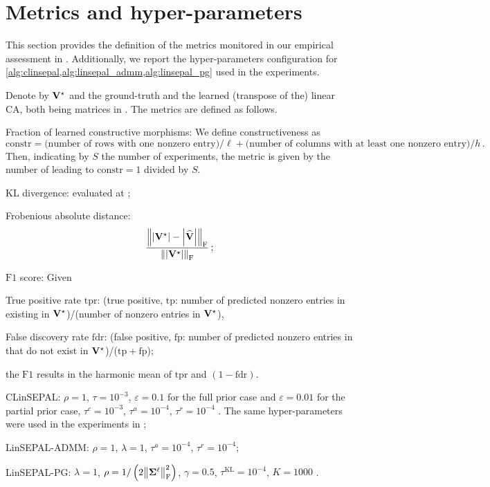 \section{Metrics and hyper-parameters}\label{app:metrics}

This section provides the definition of the metrics monitored in our empirical assessment in .
Additionally, we report the hyper-parameters configuration for \cref{alg:clinsepal,alg:linsepal_admm,alg:linsepal_pg} used in the experiments.

Denote by $\mathbf{V}^\star$ and \Vhat the ground-truth and the learned (transpose of the) linear CA, both being matrices in \rmatdim.
The metrics are defined as follows.
\begin{squishlist}
    \item Fraction of learned constructive morphisms: We define constructiveness as 
    \begin{equation}
        \mathrm{constr}=\text{(number of rows with one nonzero entry)}/\ell +\text{(number of columns with at least one nonzero entry)}/h\,.
    \end{equation}
    Then, indicating by $S$ the number of experiments, the metric is given by the number of \Vhat leading to $\mathrm{constr}=1$ divided by $S$.
    \item KL divergence:  evaluated at \Vhat;
    \item Frobenious absolute distance: 
    \begin{equation}
        \frac{\norm{\abs{\mathbf{V}^\star} - \abs{\widehat{\mathbf{V}}}}_{\mathrm{F}}}{\norm{\abs{\mathbf{V}^\star}}_{\mathrm{F}}}\,;
    \end{equation}
    \item $\mathrm{F1}$ score: Given
    \begin{squishlist}
        \item True positive rate $\mathrm{tpr}$: (true positive, $\mathrm{tp}$: number of predicted nonzero entries in \Vhat existing in $\mathbf{V}^\star$)/(number of nonzero entries in $\mathbf{V}^\star$),
        \item False discovery rate $\mathrm{fdr}$: (false positive, $\mathrm{fp}$: number of predicted nonzero entries in \Vhat that do not exist in $\mathbf{V}^\star$)/($\mathrm{tp}+\mathrm{fp}$);
    \end{squishlist}
    the $\mathrm{F1}$ results in the harmonic mean of $\mathrm{tpr}$ and $(1-\mathrm{fdr})$.
\end{squishlist}

\begin{squishlist}
    \item CLinSEPAL: $\rho=1$, $\tau=10^{-3}$, $\varepsilon=0.1$ for the full prior case and $\varepsilon=0.01$ for the partial prior case, $\tau^c=10^{-3}$, $\tau^a=10^{-4}$, $\tau^r=10^{-4}$ . The same hyper-parameters were used in the experiments in ;
    \item LinSEPAL-ADMM: $\rho=1$, $\lambda=1$, $\tau^a=10^{-4}$, $\tau^r=10^{-4}$;
    \item LinSEPAL-PG: $\lambda=1$, $\rho=1/\left(2 \norm{\boldsymbol{\Sigma}^{\ell}}_{\mathrm{F}}^2\right)$, $\gamma=0.5$, $\tau^{\mathrm{KL}}=10^{-4}$, $K=1000$ .
\end{squishlist}
